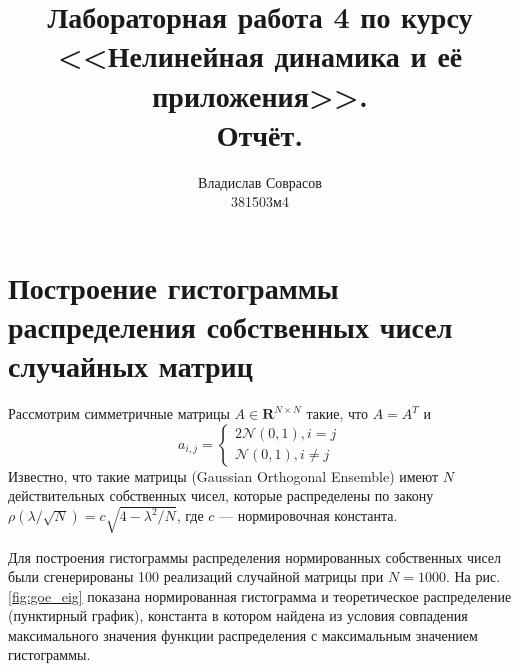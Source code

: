 \documentclass[a4paper]{article}
\begin{document}
\title{Лабораторная работа 4 по курсу <<Нелинейная динамика и её приложения>>. \\Отчёт.}
\author{Владислав Соврасов\\ 381503м4}
\date{}
\maketitle

\section{Построение гистограммы распределения собственных чисел случайных матриц}
Рассмотрим симметричные матрицы \(A\in \mathbf{R}^{N\times N}\) такие, что \(A=A^T\) и
\begin{displaymath}
	a_{i,j} = \left\{
  \begin{array}{lr}
    2\mathcal{N}(0,1), i=j\\
		\mathcal{N}(0,1), i	\neq j
  \end{array}
\right.
\end{displaymath}
Известно, что такие матрицы (Gaussian Orthogonal Ensemble) имеют \(N\) действительных собственных чисел, которые
распределены по закону \(\rho(\lambda / \sqrt{N})=c \sqrt{4-\lambda^2/N}\), где
\(c\) --- нормировочная константа.

Для построения гистограммы распределения нормированных собственных чисел были
сгенерированы 100 реализаций случайной матрицы при \(N=1000\). На рис. \ref{fig:goe_eig}
показана нормированная гистограмма и теоретическое распределение (пунктирный график), константа
в котором найдена из условия совпадения максимального значения функции распределения
с максимальным значением гистограммы.
\end{document}
